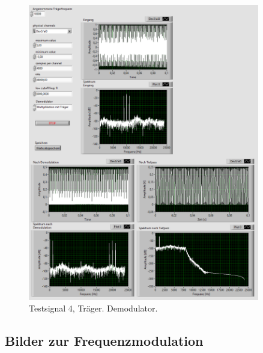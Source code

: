 \begin{figure}[H]
	\centering
	\includegraphics[width=0.9\textwidth]{pic/dam_4_traeger.png}
	\caption{Testsignal 4, Träger. Demodulator.}
	\label{fig:a6}	
\end{figure}

\newpage

\subsection{Bilder zur Frequenzmodulation}

